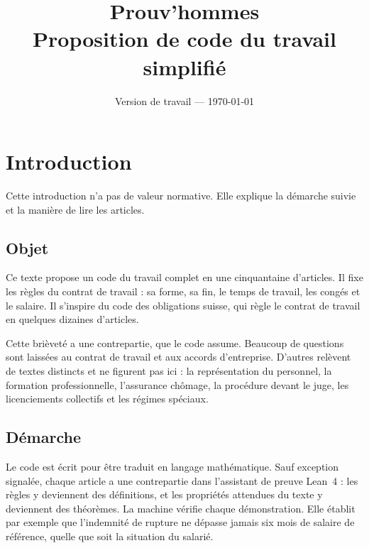 \documentclass[11pt,a4paper]{article}
\title{Prouv'hommes\\[0.3em]\large Proposition de code du travail simplifié}
\author{}
\date{Version de travail --- \today}
\newcounter{article}
\begin{document}
\maketitle
\tableofcontents

\section*{Introduction}

Cette introduction n'a pas de valeur normative. Elle explique la démarche
suivie et la manière de lire les articles.

\subsection*{Objet}
Ce texte propose un code du travail complet en une cinquantaine d'articles.
Il fixe les règles du contrat de travail : sa forme, sa fin, le temps de
travail, les congés et le salaire. Il s'inspire du code des obligations
suisse, qui règle le contrat de travail en quelques dizaines d'articles.

Cette brièveté a une contrepartie, que le code assume. Beaucoup de questions
sont laissées au contrat de travail et aux accords d'entreprise. D'autres
relèvent de textes distincts et ne figurent pas ici : la représentation du
personnel, la formation professionnelle, l'assurance chômage, la procédure
devant le juge, les licenciements collectifs et les régimes spéciaux.

\subsection*{Démarche}
Le code est écrit pour être traduit en langage mathématique. Sauf exception
signalée, chaque article a une contrepartie dans l'assistant de preuve
Lean~4 : les règles y deviennent
des définitions, et les propriétés attendues du texte y deviennent des
théorèmes. La machine vérifie chaque démonstration. Elle établit par exemple
que l'indemnité de rupture ne dépasse jamais six mois de salaire de
référence, quelle que soit la situation du salarié.
\end{document}
